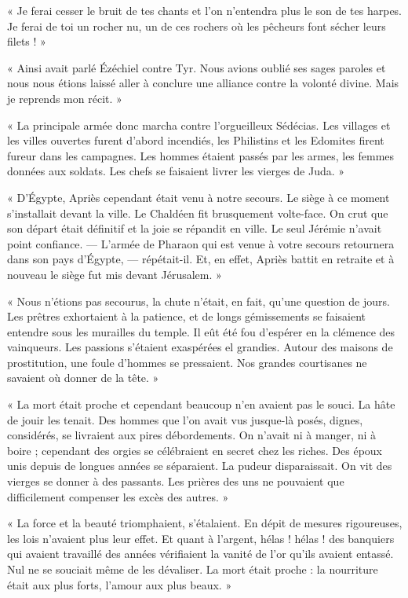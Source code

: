 \documentclass[a4paper, 11pt, oneside, polutonikogreek, french]{article}
\begin{document}
« Je ferai cesser le bruit de tes chants et l'on n'entendra plus le son de tes harpes. Je ferai de toi un rocher nu, un de ces rochers où les pêcheurs font sécher leurs filets ! »

\bigskip
\centerline{\EightStarTaper}
\centerline{\EightStarTaper\EightStarTaper}
\bigskip

« Ainsi avait parlé Ézéchiel contre Tyr. Nous avions oublié ses sages paroles et nous nous étions laissé aller à conclure une alliance contre la volonté divine. Mais je reprends mon récit. »

« La principale armée donc marcha contre l'orgueilleux Sédécias. Les villages et les villes ouvertes furent d'abord incendiés, les Philistins et les Edomites firent fureur dans les campagnes. Les hommes étaient passés par les armes, les femmes données aux soldats. Les chefs se faisaient livrer les vierges de Juda. »

« D'Égypte, Apriès cependant était venu à notre secours. Le siège à ce moment s'installait devant la ville. Le Chaldéen fit brusquement volte-face. On crut que son départ était définitif et la joie se répandit en ville. Le seul Jérémie n'avait point confiance. --- L'armée de Pharaon qui est venue à votre secours retournera dans son pays d'Égypte, --- répétait-il. Et, en effet, Apriès battit en retraite et à nouveau le siège fut mis devant Jérusalem. »

« Nous n'étions pas secourus, la chute n'était, en fait, qu'une question de jours. Les prêtres exhortaient à la patience, et de longs gémissements se faisaient entendre sous les murailles du temple. Il eût été fou d'espérer en la clémence des vainqueurs. Les passions s'étaient exaspérées el grandies. Autour des maisons de prostitution, une foule d'hommes se pressaient. Nos grandes courtisanes ne savaient où donner de la tête. »

« La mort était proche et cependant beaucoup n'en avaient pas le souci. La hâte de jouir les tenait. Des hommes que l'on avait vus jusque-là posés, dignes, considérés, se livraient aux pires débordements. On n'avait ni à manger, ni à boire ; cependant des orgies se célébraient en secret chez les riches. Des époux unis depuis de longues années se séparaient. La pudeur disparaissait. On vit des vierges se donner à des passants. Les prières des uns ne pouvaient que difficilement compenser les excès des autres. »

« La force et la beauté triomphaient, s'étalaient. En dépit de mesures rigoureuses, les lois n'avaient plus leur effet. Et quant à l'argent, hélas ! hélas ! des banquiers qui avaient travaillé des années vérifiaient la vanité de l'or qu'ils avaient entassé. Nul ne se souciait même de les dévaliser. La mort était proche : la nourriture était aux plus forts, l'amour aux plus beaux. »
\end{document}

